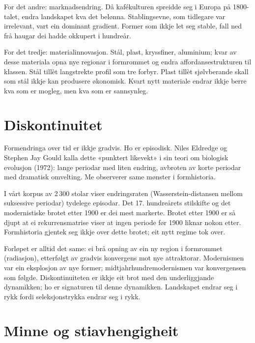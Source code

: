 For det andre: marknadsendring. Då kafékulturen spreidde seg i Europa på 1800-talet, endra landskapet kva det belønna. Stablingsevne, som tidlegare var irrelevant, vart ein dominant gradient. Former som ikkje let seg stable, fall ned frå haugar dei hadde okkupert i hundreår.

For det tredje: materialinnovasjon. Stål, plast, kryssfiner, aluminium; kvar av desse materiala opna nye regionar i formrommet og endra affordansestrukturen til klassen. Stål tillèt langstrekte profil som tre forbyr. Plast tillèt sjølvberande skall som stål ikkje kan produsere økonomisk. Kvart nytt materiale endrar ikkje berre kva som er mogleg, men kva som er sannsynleg.

\section*{Diskontinuitet}


Formendringa over tid er ikkje gradvis. Ho er episodisk. Niles Eldredge og Stephen Jay Gould kalla dette «punktert likevekt» i sin teori om biologisk evolusjon (1972): lange periodar med liten endring, avbroten av korte periodar med dramatisk omvelting. Me observerer same mønster i formhistoria.

I vårt korpus av 2\,300 stolar viser endringsraten (Wasserstein-distansen mellom suksessive periodar) tydelege episodar. Det 17. hundreårets stilskifte og det modernistiske brotet etter 1900 er dei mest markerte. Brotet etter 1900 er så djupt at ei rekurrensmatrise viser at ingen periode før 1900 liknar nokon etter. Formhistoria gjentek seg ikkje over dette brotet; eit nytt regime tok over.

Forløpet er alltid det same: ei brå opning av ein ny region i formrommet (radiasjon), etterfølgt av gradvis konvergens mot nye attraktorar. Modernismen var ein eksplosjon av nye former; midtjahrhundremodernismen var konvergensen som følgde. Diskontinuiteten er ikkje eit brot med den underliggjande dynamikken; ho er signaturen til denne dynamikken. Landskapet endrar seg i rykk fordi seleksjonstrykka endrar seg i rykk.

\section*{Minne og stiavhengigheit}

